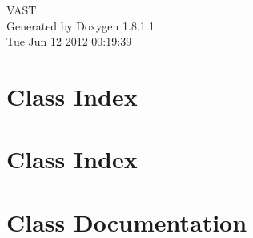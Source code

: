 \documentclass{book}
\begin{document}
\hypersetup{pageanchor=false,citecolor=blue}
\begin{titlepage}
\vspace*{7cm}
\begin{center}
{\Large V\-A\-S\-T }\\
\vspace*{1cm}
{\large Generated by Doxygen 1.8.1.1}\\
\vspace*{0.5cm}
{\small Tue Jun 12 2012 00:19:39}\\
\end{center}
\end{titlepage}
\clearemptydoublepage
{}
\tableofcontents
\clearemptydoublepage
{}
\hypersetup{pageanchor=true,citecolor=blue}
\chapter{Class Index}

\chapter{Class Index}

\chapter{Class Documentation}



























\printindex
\end{document}
